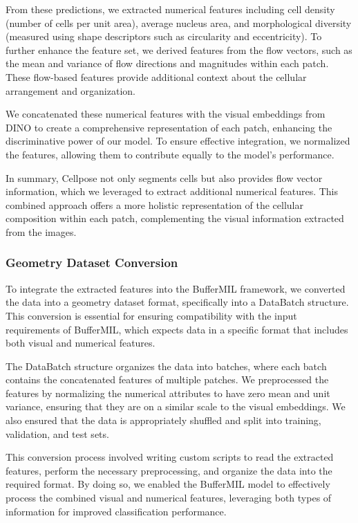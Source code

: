 \documentclass[10pt,twocolumn]{article}
\begin{document}
From these predictions, we extracted numerical features including cell density (number of cells per unit area), average nucleus area, and morphological diversity (measured using shape descriptors such as circularity and eccentricity). To further enhance the feature set, we derived features from the flow vectors, such as the mean and variance of flow directions and magnitudes within each patch. These flow-based features provide additional context about the cellular arrangement and organization.

We concatenated these numerical features with the visual embeddings from DINO to create a comprehensive representation of each patch, enhancing the discriminative power of our model. To ensure effective integration, we normalized the features, allowing them to contribute equally to the model's performance.

In summary, Cellpose not only segments cells but also provides flow vector information, which we leveraged to extract additional numerical features. This combined approach offers a more holistic representation of the cellular composition within each patch, complementing the visual information extracted from the images.



\subsubsection{Geometry Dataset Conversion}

To integrate the extracted features into the BufferMIL framework, we converted the data into a geometry dataset format, specifically into a DataBatch structure. This conversion is essential for ensuring compatibility with the input requirements of BufferMIL, which expects data in a specific format that includes both visual and numerical features.

The DataBatch structure organizes the data into batches, where each batch contains the concatenated features of multiple patches. We preprocessed the features by normalizing the numerical attributes to have zero mean and unit variance, ensuring that they are on a similar scale to the visual embeddings. We also ensured that the data is appropriately shuffled and split into training, validation, and test sets.

This conversion process involved writing custom scripts to read the extracted features, perform the necessary preprocessing, and organize the data into the required format. By doing so, we enabled the BufferMIL model to effectively process the combined visual and numerical features, leveraging both types of information for improved classification performance.
\end{document}

